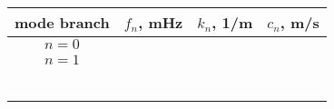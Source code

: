\documentclass[11pt,titlepage,fleqn]{article}
\begin{document}
\begin{table}
\vspace{-5cm}
\centering
\caption[]
{{
\label{tab:T3}
}}
\begin{spacing}{1.5}
\begin{tabular}{c|c|c|c}
\hline\hline
mode branch & $f_n$, mHz & $k_n$, 1/m & $c_n$, m/s \\ \hline\hline
$n=0$ & \hspace{2cm} & \hspace{2cm} & \hspace{2cm} \\ \hline
$n=1$ & & & \\ \hline
 & & & \\ \hline
 & & & \\ \hline
 & & & \\ \hline
 & & \\ \hline
 & & & \\ \hline
 & & & \\ \hline
\end{tabular}
\end{spacing}
\end{table}

\end{document}
